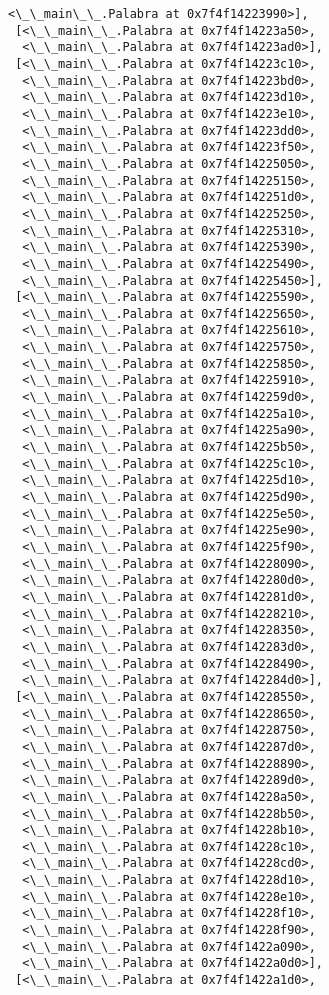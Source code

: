 \documentclass[12pt,a4paper,table]{article}
\begin{document}
\begin{tcolorbox}[breakable, size=fbox, boxrule=.5pt, pad at break*=1mm, opacityfill=0]
\begin{Verbatim}[commandchars=\\\{\}]
  <\_\_main\_\_.Palabra at 0x7f4f14223990>],
 [<\_\_main\_\_.Palabra at 0x7f4f14223a50>,
  <\_\_main\_\_.Palabra at 0x7f4f14223ad0>],
 [<\_\_main\_\_.Palabra at 0x7f4f14223c10>,
  <\_\_main\_\_.Palabra at 0x7f4f14223bd0>,
  <\_\_main\_\_.Palabra at 0x7f4f14223d10>,
  <\_\_main\_\_.Palabra at 0x7f4f14223e10>,
  <\_\_main\_\_.Palabra at 0x7f4f14223dd0>,
  <\_\_main\_\_.Palabra at 0x7f4f14223f50>,
  <\_\_main\_\_.Palabra at 0x7f4f14225050>,
  <\_\_main\_\_.Palabra at 0x7f4f14225150>,
  <\_\_main\_\_.Palabra at 0x7f4f142251d0>,
  <\_\_main\_\_.Palabra at 0x7f4f14225250>,
  <\_\_main\_\_.Palabra at 0x7f4f14225310>,
  <\_\_main\_\_.Palabra at 0x7f4f14225390>,
  <\_\_main\_\_.Palabra at 0x7f4f14225490>,
  <\_\_main\_\_.Palabra at 0x7f4f14225450>],
 [<\_\_main\_\_.Palabra at 0x7f4f14225590>,
  <\_\_main\_\_.Palabra at 0x7f4f14225650>,
  <\_\_main\_\_.Palabra at 0x7f4f14225610>,
  <\_\_main\_\_.Palabra at 0x7f4f14225750>,
  <\_\_main\_\_.Palabra at 0x7f4f14225850>,
  <\_\_main\_\_.Palabra at 0x7f4f14225910>,
  <\_\_main\_\_.Palabra at 0x7f4f142259d0>,
  <\_\_main\_\_.Palabra at 0x7f4f14225a10>,
  <\_\_main\_\_.Palabra at 0x7f4f14225a90>,
  <\_\_main\_\_.Palabra at 0x7f4f14225b50>,
  <\_\_main\_\_.Palabra at 0x7f4f14225c10>,
  <\_\_main\_\_.Palabra at 0x7f4f14225d10>,
  <\_\_main\_\_.Palabra at 0x7f4f14225d90>,
  <\_\_main\_\_.Palabra at 0x7f4f14225e50>,
  <\_\_main\_\_.Palabra at 0x7f4f14225e90>,
  <\_\_main\_\_.Palabra at 0x7f4f14225f90>,
  <\_\_main\_\_.Palabra at 0x7f4f14228090>,
  <\_\_main\_\_.Palabra at 0x7f4f142280d0>,
  <\_\_main\_\_.Palabra at 0x7f4f142281d0>,
  <\_\_main\_\_.Palabra at 0x7f4f14228210>,
  <\_\_main\_\_.Palabra at 0x7f4f14228350>,
  <\_\_main\_\_.Palabra at 0x7f4f142283d0>,
  <\_\_main\_\_.Palabra at 0x7f4f14228490>,
  <\_\_main\_\_.Palabra at 0x7f4f142284d0>],
 [<\_\_main\_\_.Palabra at 0x7f4f14228550>,
  <\_\_main\_\_.Palabra at 0x7f4f14228650>,
  <\_\_main\_\_.Palabra at 0x7f4f14228750>,
  <\_\_main\_\_.Palabra at 0x7f4f142287d0>,
  <\_\_main\_\_.Palabra at 0x7f4f14228890>,
  <\_\_main\_\_.Palabra at 0x7f4f142289d0>,
  <\_\_main\_\_.Palabra at 0x7f4f14228a50>,
  <\_\_main\_\_.Palabra at 0x7f4f14228b50>,
  <\_\_main\_\_.Palabra at 0x7f4f14228b10>,
  <\_\_main\_\_.Palabra at 0x7f4f14228c10>,
  <\_\_main\_\_.Palabra at 0x7f4f14228cd0>,
  <\_\_main\_\_.Palabra at 0x7f4f14228d10>,
  <\_\_main\_\_.Palabra at 0x7f4f14228e10>,
  <\_\_main\_\_.Palabra at 0x7f4f14228f10>,
  <\_\_main\_\_.Palabra at 0x7f4f14228f90>,
  <\_\_main\_\_.Palabra at 0x7f4f1422a090>,
  <\_\_main\_\_.Palabra at 0x7f4f1422a0d0>],
 [<\_\_main\_\_.Palabra at 0x7f4f1422a1d0>,

\end{Verbatim}
\end{tcolorbox}
\end{document}
